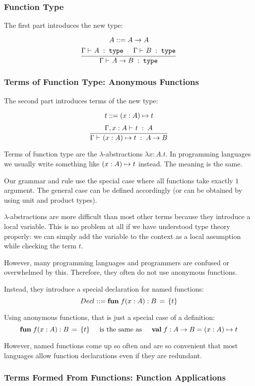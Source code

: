 \subsubsection{Function Type}

The first part introduces the new type:

\[A ::= A\to A\]
\[\cfrac{\Gamma\vdash^{}_{}A\;:\;\mathtt{type}\hspace*{.5cm} \Gamma\vdash^{}_{}B\;:\;\mathtt{type}}{\Gamma\vdash^{}_{}A\to B\;:\;\mathtt{type}}\,\]

\subsubsection{Terms of Function Type: Anonymous Functions}

The second part introduces terms of the new type:

\[t \bbc \alam[A]{x}{t}\]
\[\rul{\oftype{}{\Gamma,x:A}{t}{A}}{\oftype{}{\Gamma}{\alam[A]{x}{t}}{A\to B}}\]

Terms of function type are the $\lambda$-abstractions $\lambda x:A.t$.
In programming languages we usually write something like $\alam[A]{x}{t}$ instead.
The meaning is the same.

Our grammar and rule use the special case where all functions take exactly $1$ argument.
The general case can be defined accordingly (or can be obtained by using unit and product types).

$\lambda$-abstractions are more difficult than most other terms because they introduce a local variable.
This is no problem at all if we have understood type theory properly: we can simply add the variable to the context as a local assumption while checking the term $t$.
\medskip

However, many programming languages and programmers are confused or overwhelmed by this.
Therefore, they often do not use anonymous functions.

Instead, they introduce a special declaration for named functions:
\[Decl \bbc \afunI[B]{f}{x:A}{t}\]

Using anonymous functions, that is just a special case of a definition:
\[\afunI[B]{f}{x:A}{t} \tb\text{is the same as}\tb \aval{f}{A\to B}{\alam[A]{x}{t}}\]

However, named functions come up so often and are so convenient that most languages allow function declarations even if they are redundant.

\subsubsection{Terms Formed From Functions: Function Applications}


